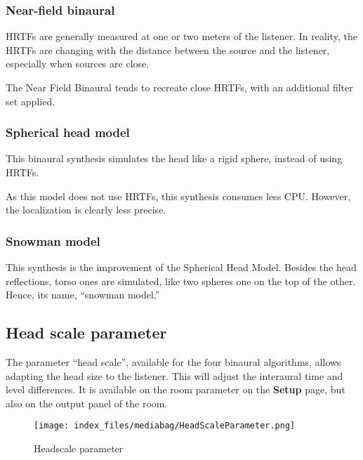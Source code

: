 \documentclass[
  letterpaper,
  DIV=11,
  numbers=noendperiod]{scrreport}
\begin{document}
\hypertarget{near-field-binaural}{%
\subsubsection{Near-field binaural}\label{near-field-binaural}}

HRTFs are generally measured at one or two meters of the listener. In
reality, the HRTFs are changing with the distance between the source and
the listener, especially when sources are close.

The Near Field Binaural tends to recreate close HRTFs, with an
additional filter set applied.

\hypertarget{spherical-head-model}{%
\subsubsection{Spherical head model}\label{spherical-head-model}}

This binaural synthesis simulates the head like a rigid sphere, instead
of using HRTFs.

As this model does not use HRTFs, this synthesis consumes less CPU.
However, the localization is clearly less precise.

\hypertarget{snowman-model}{%
\subsubsection{Snowman model}\label{snowman-model}}

This synthesis is the improvement of the Spherical Head Model. Besides
the head reflections, torso ones are simulated, like two spheres one on
the top of the other. Hence, its name, ``snowman model.''

\hypertarget{head-scale-parameter}{%
\subsection{Head scale parameter}\label{head-scale-parameter}}

The parameter ``head scale'', available for the four binaural
algorithms, allows adapting the head size to the listener. This will
adjust the interaural time and level differences. It is available on the
room parameter on the \textbf{Setup} page, but also on the output panel
of the room.

\begin{figure}

{\centering \texttt{[image: index\_files/mediabag/HeadScaleParameter.png]}

}

\caption{Headscale parameter}

\end{figure}
\end{document}

